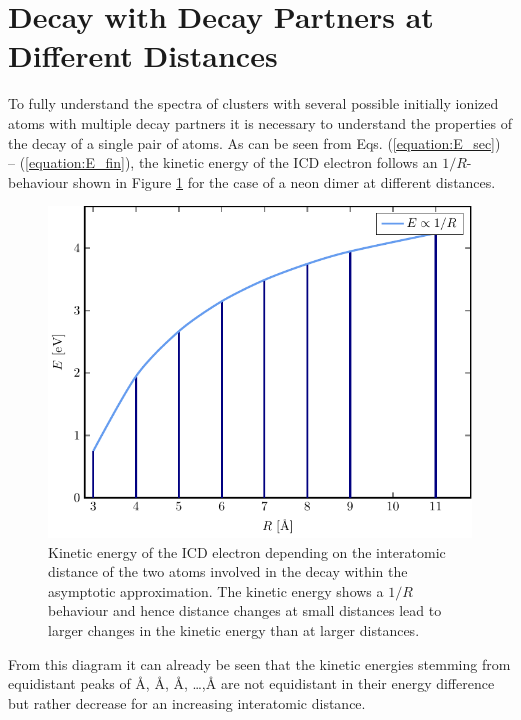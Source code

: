 \section{Decay with Decay Partners at Different Distances}
\label{sec:partners}

To fully understand the spectra of clusters with several possible
initially ionized atoms with multiple decay partners it is necessary to
understand the properties of the decay of a single pair of atoms. As can be seen
from Eqs. (\ref{equation:E_sec}) -- (\ref{equation:E_fin}),
the kinetic energy of the ICD electron follows an
$1/R$-behaviour shown in Figure \ref{figure:model_RE} for the case
of a neon dimer at different distances.

\begin{figure}[h]
 \centering
 \includegraphics[width=\columnwidth]{pics/model_RE.pdf}
 \caption{Kinetic energy of the ICD electron depending on the interatomic
          distance of the two atoms involved in the decay within the
          asymptotic approximation. The kinetic energy shows a $1/R$
          behaviour and hence distance changes at small distances lead
          to larger changes in the kinetic energy than at larger distances.}
 \label{figure:model_RE}
\end{figure}
From this diagram it can already be
seen that the kinetic energies stemming from equidistant peaks of
\unit[3]{\AA}, \unit[4]{\AA}, \unit[5]{\AA}, \dots ,\unit[11]{\AA} are
not equidistant in their energy difference but rather decrease for
an increasing interatomic distance.

